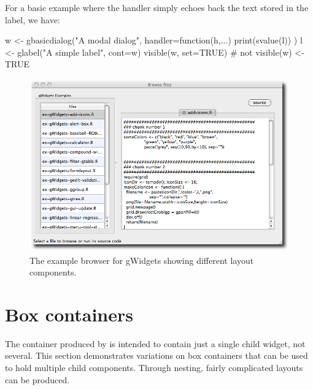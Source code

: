 For a basic example where the handler simply echoes back
the text stored in the label, we have:
\begin{Schunk}
\begin{Sinput}
 w <- gbasicdialog("A modal dialog", handler=function(h,...) {
   print(svalue(l))                      
 })
 l <- glabel("A simple label", cont=w)
 visible(w, set=TRUE)                 # not visible(w) <- TRUE
\end{Sinput}
\end{Schunk}


\begin{figure}
  \centering
  \includegraphics[width=.8\textwidth]{fig-gWidgets-example-browser}
  \caption{The example browser for gWidgets showing different layout components.}
  \label{fig:gWidgets-sample-layout}
\end{figure}



\section{Box containers}
\label{sec:gWidgets-box-containers}

The container produced by  is intended to contain
just a single child widget, not several. This section demonstrates
variations on box containers that can be used to hold multiple child
components. Through nesting, fairly complicated layouts can be
produced.



